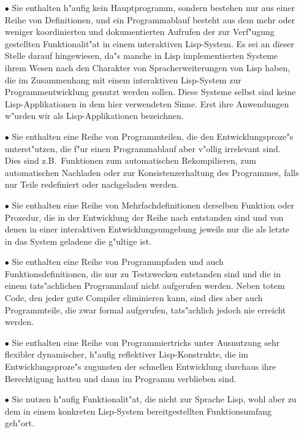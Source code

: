 \begin{itemize}

\item[$\bullet$] Sie enthalten h"aufig kein Hauptprogramm, sondern
bestehen nur aus einer Reihe von Definitionen, und ein Programmablauf
besteht aus dem mehr oder weniger koordinierten und dokumentierten
Aufrufen der zur Verf"ugung gestellten Funktionalit"at in einem
interaktiven Lisp-System. Es sei an dieser Stelle darauf hingewiesen,
da"s manche in Lisp implementierten Systeme ihrem Wesen nach den
Charakter von Spracherweiterungen von Lisp haben, die im Zusammenhang
mit einem interaktiven Lisp-System zur Programmentwicklung genutzt
werden sollen. Diese Systeme selbst sind keine Lisp-Applikationen in
dem hier verwendeten Sinne. Erst ihre Anwendungen w"urden wir als
Lisp-Applikationen bezeichnen.

\item[$\bullet$] Sie enthalten eine Reihe von Programmteilen, die den
Entwicklungsproze"s unterst"utzen, die f"ur einen Programmablauf aber
v"ollig irrelevant sind. Dies sind z.B.\ Funktionen zum automatischen
Rekompilieren, zum automatischen Nachladen oder zur
Konsistenzerhaltung des Programmes, falls nur Teile redefiniert oder
nachgeladen werden.

\item[$\bullet$] Sie enthalten eine Reihe von Mehrfachdefinitionen
derselben Funktion oder Prozedur, die in der Entwicklung der Reihe
nach entstanden sind und von denen in einer interaktiven
Entwicklungsumgebung jeweils nur die als letzte in das System geladene
die g"ultige ist.

\item[$\bullet$] Sie enthalten eine Reihe von Programmpfaden und auch
Funktionsdefinitionen, die nur zu Testzwecken entstanden sind und die
in einem tats"achlichen Programmlauf nicht aufgerufen werden. Neben
totem Code, den jeder gute Compiler eliminieren kann, sind dies aber
auch Programmteile, die zwar formal aufgerufen, tats"achlich jedoch
nie erreicht werden.

\item[$\bullet$] Sie enthalten eine Reihe von Programmiertricks unter
Ausnutzung sehr flexibler dynamischer, h"aufig reflektiver
Lisp-Konstrukte, die im Entwicklungsproze"s zugunsten der schnellen
Entwicklung durchaus ihre Berechtigung hatten und dann im Programm
verblieben sind.  

\item[$\bullet$] Sie nutzen h"aufig Funktionalit"at, die nicht zur
Sprache Lisp, wohl aber zu dem in einem konkreten Lisp-System
bereitgestellten Funktionsumfang geh"ort.

\end{itemize}

